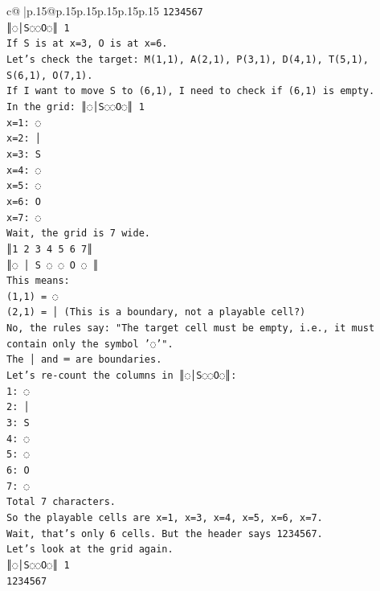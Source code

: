 \documentclass{article}
\begin{document}
{\begin{supertabular}{c@{$\;$}|p{.15\linewidth}@{}p{.15\linewidth}p{.15\linewidth}p{.15\linewidth}p{.15\linewidth}p{.15\linewidth}}
{{{\texttt{1234567} \\
\texttt{║◌│S◌◌O◌║ 1} \\
\texttt{If S is at x=3, O is at x=6.} \\
\texttt{Let's check the target: M(1,1), A(2,1), P(3,1), D(4,1), T(5,1), S(6,1), O(7,1).} \\
\texttt{If I want to move S to (6,1), I need to check if (6,1) is empty.} \\
\texttt{In the grid: ║◌│S◌◌O◌║ 1} \\
\texttt{x=1: ◌} \\
\texttt{x=2: │} \\
\texttt{x=3: S} \\
\texttt{x=4: ◌} \\
\texttt{x=5: ◌} \\
\texttt{x=6: O} \\
\texttt{x=7: ◌} \\
\texttt{Wait, the grid is 7 wide.} \\
\texttt{║1 2 3 4 5 6 7║} \\
\texttt{║◌ │ S ◌ ◌ O ◌ ║} \\
\texttt{This means:} \\
\texttt{(1,1) = ◌} \\
\texttt{(2,1) = │ (This is a boundary, not a playable cell?)} \\
\texttt{No, the rules say: "The target cell must be empty, i.e., it must contain only the symbol '◌'".} \\
\texttt{The │ and ═ are boundaries.} \\
\texttt{Let's re{-}count the columns in ║◌│S◌◌O◌║:} \\
\texttt{1: ◌} \\
\texttt{2: │} \\
\texttt{3: S} \\
\texttt{4: ◌} \\
\texttt{5: ◌} \\
\texttt{6: O} \\
\texttt{7: ◌} \\
\texttt{Total 7 characters.} \\
\texttt{So the playable cells are x=1, x=3, x=4, x=5, x=6, x=7.} \\
\texttt{Wait, that's only 6 cells. But the header says 1234567.} \\
\texttt{Let's look at the grid again.} \\
\texttt{║◌│S◌◌O◌║ 1} \\
\texttt{1234567} \\
}}}
\end{supertabular}}
\end{document}
